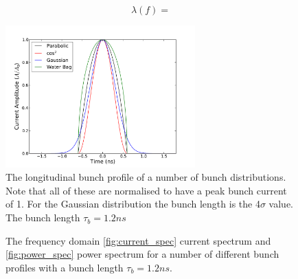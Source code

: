 \begin{equation}
\lambda \left( f \right) = 
\label{eqn:water_bag_profile_freq}
\end{equation}

\begin{figure}
\begin{center}
\includegraphics[width=0.65\textwidth]{Wakefields_and_Impedances/figures/bunch_profile_12ns.pdf}
\end{center}
\caption{The longitudinal bunch profile of a number of bunch distributions. Note that all of these are normalised to have a peak bunch current of 1. For the Gaussian distribution the bunch length is the 4$\sigma$ value. The bunch length $\tau_{b} = 1.2ns$}
\label{fig:time_bunch_profiles}
\end{figure}

\begin{figure}
\caption{The frequency domain \ref{fig:current_spec} current spectrum and \ref{fig:power_spec} power spectrum for a number of different bunch profiles with a bunch length $\tau_{b} = 1.2ns$.}
\label{fig:freq_dom_prof}
\end{figure}

